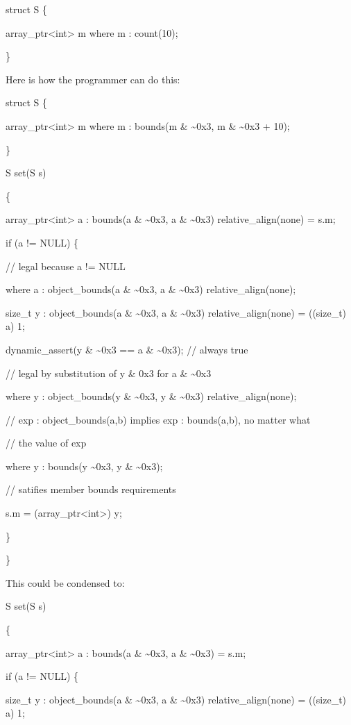 \documentclass[]{article}
\begin{document}
struct S \{

array\_ptr\textless{}int\textgreater{} m where m : count(10);

\}

Here is how the programmer can do this:

struct S \{

array\_ptr\textless{}int\textgreater{} m where m : bounds(m \&
\textasciitilde{}0x3, m \& \textasciitilde{}0x3 + 10);

\}

S set(S s)

\{

array\_ptr\textless{}int\textgreater{} a : bounds(a \&
\textasciitilde{}0x3, a \& \textasciitilde{}0x3) relative\_align(none) =
s.m;

if (a != NULL) \{

// legal because a != NULL

where a : object\_bounds(a \& \textasciitilde{}0x3, a \&
\textasciitilde{}0x3) relative\_align(none);

size\_t y : object\_bounds(a \& \textasciitilde{}0x3, a \&
\textasciitilde{}0x3) relative\_align(none) = ((size\_t) a) \textbar{}
1;

dynamic\_assert(y \& \textasciitilde{}0x3 == a \& \textasciitilde{}0x3);
// always true

// legal by substitution of y \& 0x3 for a \& \textasciitilde{}0x3

where y : object\_bounds(y \& \textasciitilde{}0x3, y \&
\textasciitilde{}0x3) relative\_align(none);

// exp : object\_bounds(a,b) implies exp : bounds(a,b), no matter what

// the value of exp

where y : bounds(y \textasciitilde{}0x3, y \& \textasciitilde{}0x3);

// satifies member bounds requirements

s.m = (array\_ptr\textless{}int\textgreater{}) y;

\}

\}

This could be condensed to:

S set(S s)

\{

array\_ptr\textless{}int\textgreater{} a : bounds(a \&
\textasciitilde{}0x3, a \& \textasciitilde{}0x3) = s.m;

if (a != NULL) \{

size\_t y : object\_bounds(a \& \textasciitilde{}0x3, a \&
\textasciitilde{}0x3) relative\_align(none) = ((size\_t) a) \textbar{}
1;
\end{document}
